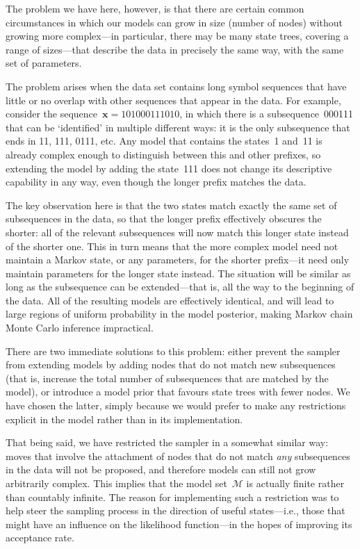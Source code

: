 \documentclass[11pt,a4paper]{article}
\newcommand\mc[1]{\mathcal{#1}}               %
\newcommand\ub[1]{\symbf{#1}}                 %
\begin{document}
The problem we have here, however, is that there are certain common
circumstances in which our models can grow in size (number of nodes) without
growing more complex---in particular, there may be many state trees, covering a
range of sizes---that describe the data in precisely the same way, with the same
set of parameters.

The problem arises when the data set contains long symbol sequences that have
little or no overlap with other sequences that appear in the data. For example,
consider the sequence~\(\ub{x} = 101000111010\), in which there is a
subsequence~000111 that can be `identified' in multiple different ways: it is
the only subsequence that ends in 11, 111, 0111, etc. Any model that contains
the states~1 and~11 is already complex enough to distinguish between this and
other prefixes, so extending the model by adding the state~111 does not change
its descriptive capability in any way, even though the longer prefix matches the
data.

The key observation here is that the two states match exactly the same set of
subsequences in the data, so that the longer prefix effectively obscures the
shorter: all of the relevant subsequences will now match this longer state
instead of the shorter one. This in turn means that the more complex model need
not maintain a Markov state, or any parameters, for the shorter prefix---it need
only maintain parameters for the longer state instead. The situation will be
similar as long as the subsequence can be extended---that is, all the way to the
beginning of the data. All of the resulting models are effectively identical,
and will lead to large regions of uniform probability in the model posterior,
making Markov chain Monte Carlo inference impractical.

There are two immediate solutions to this problem: either prevent the sampler
from extending models by adding nodes that do not match new subsequences (that
is, increase the total number of subsequences that are matched by the model), or
introduce a model prior that favours state trees with fewer nodes. We have
chosen the latter, simply because we would prefer to make any restrictions
explicit in the model rather than in its implementation.

That being said, we have restricted the sampler in a somewhat similar way: moves
that involve the attachment of nodes that do not match \emph{any} subsequences
in the data will not be proposed, and therefore models can still not grow
arbitrarily complex. This implies that the model set~\(\mc{M}\) is actually
finite rather than countably infinite. The reason for implementing such a
restriction was to help steer the sampling process in the direction of useful
states---i.e., those that might have an influence on the likelihood
function---in the hopes of improving its acceptance rate.
\end{document}

